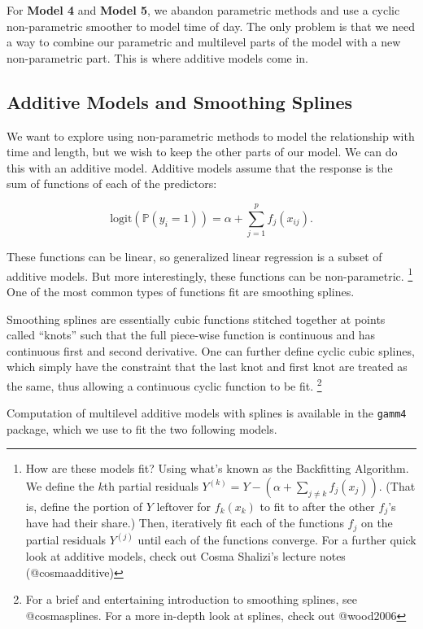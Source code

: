 \documentclass[]{article}
\let\rmarkdownfootnote\footnote%
\def\footnote{\protect\rmarkdownfootnote}
\begin{document}
For \textbf{Model 4} and \textbf{Model 5}, we abandon parametric methods
and use a cyclic non-parametric smoother to model time of day. The only
problem is that we need a way to combine our parametric and multilevel
parts of the model with a new non-parametric part. This is where
additive models come in.

\subsection{Additive Models and Smoothing
Splines}\label{additive-models-and-smoothing-splines}

We want to explore using non-parametric methods to model the
relationship with time and length, but we wish to keep the other parts
of our model. We can do this with an additive model. Additive models
assume that the response is the sum of functions of each of the
predictors:

\[\text{logit} (\mathbb{P}(y_i = 1)) =
\alpha + \sum_{j = 1}^p f_j(x_{ij}).\]

These functions can be linear, so generalized linear regression is a
subset of additive models. But more interestingly, these functions can
be non-parametric. \footnote{How are these models fit? Using what's
  known as the Backfitting Algorithm. We define the \(k\)th partial
  residuals
  \(Y^{(k)} = Y - \left(\alpha + \sum_{j \neq k} f_j(x_j)\right)\).
  (That is, define the portion of \(Y\) leftover for \(f_k(x_k)\) to fit
  to after the other \(f_j\)'s have had their share.) Then, iteratively
  fit each of the functions \(f_j\) on the partial residuals \(Y^{(j)}\)
  until each of the functions converge. For a further quick look at
  additive models, check out Cosma Shalizi's lecture notes
  (@cosmaadditive)} One of the most common types of functions fit are
smoothing splines.

Smoothing splines are essentially cubic functions stitched together at
points called ``knots'' such that the full piece-wise function is
continuous and has continuous first and second derivative. One can
further define cyclic cubic splines, which simply have the constraint
that the last knot and first knot are treated as the same, thus allowing
a continuous cyclic function to be fit. \footnote{For a brief and
  entertaining introduction to smoothing splines, see @cosmasplines. For
  a more in-depth look at splines, check out @wood2006}

Computation of multilevel additive models with splines is available in
the \texttt{gamm4} package, which we use to fit the two following
models.
\end{document}
